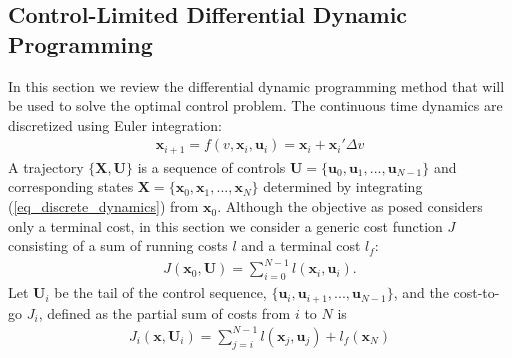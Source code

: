 \documentclass[letterpaper, paper,11pt]{AAS}
\newcommand{\state}{\ensuremath{\mathbf{x}}}
\newcommand{\control}{\ensuremath{\mathbf{u}}}
\newcommand{\State}{\ensuremath{\mathbf{X}}}
\newcommand{\Control}{\ensuremath{\mathbf{U}}}
\begin{document}
\subsection{Control-Limited Differential Dynamic Programming}
In this section we review the differential dynamic programming method that will be used to solve the optimal control problem. 
The continuous time dynamics are discretized using Euler integration:
\begin{align}
\state_{i+1} = f(v, \state_i,\control_i) = \state_i + \state_i'\Delta v \label{eq_discrete_dynamics}
\end{align}
A trajectory $\{\State,\Control\}$ is a sequence of controls $ \Control=\{\control_0,\control_1,...,\control_{N-1}\} $ and corresponding states $\State=\{\state_0,\state_1,...,\state_N\}$ determined by integrating (\ref{eq_discrete_dynamics}) from $\state_0$.
Although the objective as posed considers only a terminal cost, in this section we consider a generic cost function $J$ consisting of a sum of running costs $l$ and a terminal cost $l_f$:
\begin{align}
J(\state_0,\Control) = \sum_{i=0}^{N-1}l(\state_i,\control_i).
\end{align}
Let $\Control_i$ be the tail of the control sequence, $\{\control_i,\control_{i+1},...,\control_{N-1}\}$, and the cost-to-go $J_i$, defined as the partial sum of costs from $i$ to $N$ is
\begin{align}
J_i(\state,\Control_i) = \sum_{j=i}^{N-1}l(\state_j,\control_j) + l_f(\state_N)
\end{align}
\end{document}
